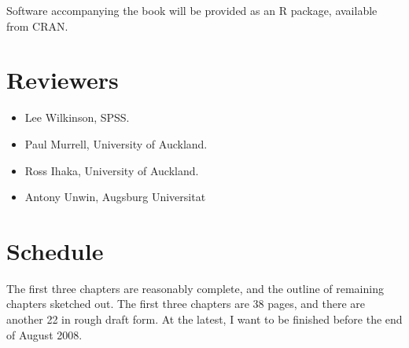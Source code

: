 \documentclass[oneside,letterpaper]{scrartcl}
\begin{document}
Software accompanying the book will be provided as an R package, available from CRAN.  

% 

\section{Reviewers}\label{sec:reviewers}


\begin{itemize}

	\item Lee Wilkinson, SPSS.

	\item Paul Murrell, University of Auckland.

	\item Ross Ihaka, University of Auckland.

	\item Antony Unwin, Augsburg Universitat

\end{itemize}

\section{Schedule}\label{sec:schedule}


The first three chapters are reasonably complete, and the outline of remaining chapters sketched out.  The first three chapters are 38 pages, and there are another 22 in rough draft form.  At the latest, I want to be finished before the end of August 2008.
\end{document}
